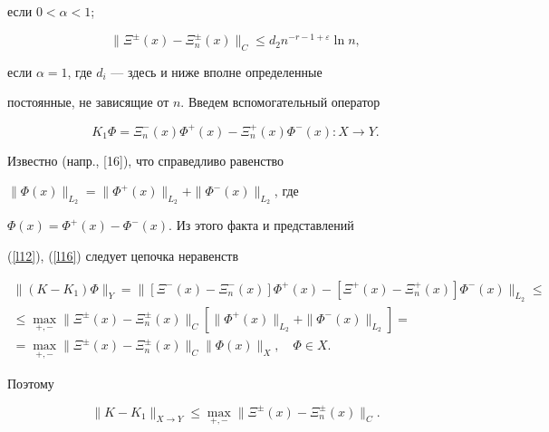 \begin{pf}
\begin{equation}
\end{equation}


если $0<\alpha <1$;


\begin{equation}


\label{l15} \|\Xi^\pm(x)-\Xi^\pm_n(x)\|_C \leqslant


d_2n^{-r-1+\varepsilon}\ln n,


\end{equation}


если $\alpha=1$, где $d_i$ --- здесь и ниже вполне определенные


постоянные, не зависящие от $n$. Введем вспомогательный оператор


\begin{equation}


\label{l16} K_1\Phi=\Xi^-_n(x)\Phi^+(x)-\Xi^+_n(x)\Phi^-(x): 


X\rightarrow Y.


\end{equation}


Известно (напр., [16]), что справедливо равенство


$\|\Phi(x)\|_{L_2}=\|\Phi^+(x)\|_{L_2}+\|\Phi^-(x)\|_{L_2}$, где


$\Phi(x)=\Phi^+(x)-\Phi^-(x)$. Из этого факта и представлений


(\ref{l12}), (\ref{l16}) следует цепочка неравенств


\begin{multline*}


\|(K-K_1)\Phi\|_Y=\|[\Xi^-(x)-\Xi^-_n(x)]\Phi^+(x)-[\Xi^+(x)-\Xi^+_n(x)]\Phi^-(x)\|_{L_2}\leqslant\\


%


\leqslant \max_{+,-}\|\Xi^\pm(x)-\Xi^\pm_n(x)\|_C


\left[\|\Phi^+(x)\|_{L_2}+\|\Phi^-(x)\|_{L_2}\right]=\\


%


=\max_{+,-}\|\Xi^\pm(x) -\Xi^\pm_n(x)\|_C\|\Phi(x)\|_X,\quad \Phi\in X.


\end{multline*}


Поэтому


\begin{equation}


\label{l17} \|K-K_1\|_{X\rightarrow Y}\leqslant


\max_{+,-}\|\Xi^\pm(x)-\Xi^\pm_n(x)\|_C.



\end{equation}
\end{pf}

